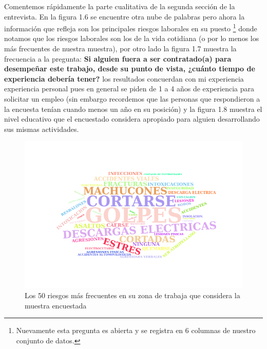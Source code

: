 \documentclass[paper=letter, fontsize=11pt]{scrartcl}
\numberwithin{equation}{section} %
\numberwithin{figure}{section} %
\numberwithin{table}{section} %
\begin{document}
Comentemos rápidamente la parte cualitativa de la segunda sección de la entrevista. En la figura 1.6 se encuentre otra nube de palabras pero ahora la información que refleja son los principales riesgos laborales en su puesto \footnote{Nuevamente esta pregunta es abierta y se registra en 6 columnas de nuestro conjunto de datos.} donde notamos que los riesgos laborales son los de la vida cotidiana (o por lo menos los más frecuentes de nuestra muestra), por otro lado la figura 1.7 muestra la frecuencia a la pregunta: \textbf{Si alguien fuera a ser contratado(a) para desempeñar este trabajo, desde su punto de vista, ¿cuánto tiempo de experiencia debería tener?} los resultados concuerdan con mi experiencia experiencia personal pues en general se piden de 1 a 4 años de experiencia para solicitar un empleo (sin embargo recordemos que las personas que respondieron a la encuesta tenían cuando menos un año en su posición) y la figura 1.8 muestra el nivel educativo que el encuestado considera apropiado para alguien desarrollando sus mismas actividades.
\begin{figure}[H]
  \begin{center}
    \includegraphics[scale=.5]{50_riesgos.png}
    \caption{ Los 50 riesgos más frecuentes en su zona de trabaja que considera la muestra encuestada}
    \label{figura1_6}
  \end{center}
\end{figure}
\end{document}
